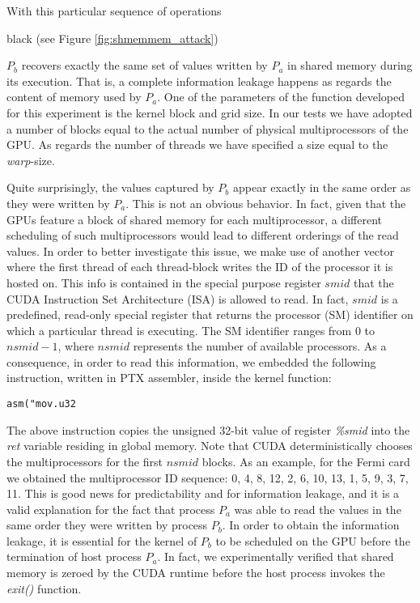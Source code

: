 \documentclass[11pt,onecolumn,letterpaper]{IEEEtran}
\newcommand{\clr}{black}
\begin{document}
With this particular sequence of operations 
\begin{color}{\clr}
(see Figure \ref{fig:shmemmem_attack})  
\end{color}
\label{leakagequantity} 
$P_b$ recovers exactly the same set of values written by $P_a$ in shared memory during its execution.
That is, a complete information leakage happens as regards the content of memory used by $P_a$.
One of the parameters of the function developed for this experiment is the kernel block and grid size.
In our tests we have adopted a number of blocks equal to the actual number of physical multiprocessors of the GPU.
As regards the number of threads we have specified a size equal to the \textit{warp}-size.

Quite surprisingly, the values captured by $P_b$ appear exactly in the same order as they were written by $P_a$.
This is not an obvious behavior. 
In fact, given that the GPUs feature a block of shared memory for each multiprocessor, 
a different scheduling of such multiprocessors would lead to different orderings of the read values.
In order to better investigate this issue, we make use of another vector 
where the first thread of each thread-block writes the ID of the processor it is hosted on. This info is contained in the special purpose register $smid$ that the CUDA Instruction Set Architecture (ISA) is allowed to read.
In fact, $smid$ is a predefined, read-only special register that returns the processor (SM) identifier on which a particular thread is executing.
The SM identifier ranges from $0$ to $nsmid-1$, where $nsmid$ represents the number of available processors.
As a consequence, in order to read this information, we embedded the following instruction, written in PTX assembler, inside the kernel function:
\begin{Verbatim}[frame=single]
asm("mov.u32 \end{Verbatim}
The above instruction copies the unsigned 32-bit value of register \emph{\%smid} into the \emph{ret} variable residing in global memory.
Note that CUDA deterministically chooses the multiprocessors for the first $nsmid$ blocks.
As an example, for the Fermi card we obtained the multiprocessor ID sequence: 0, 4, 8, 12, 2, 6, 10, 13, 1, 5, 9, 3, 7, 11.
This is good news for predictability and for information leakage, 
and it is a valid explanation for the fact that process $P_a$ was able to read the values in the same order they were written by process $P_b$.
In order to obtain the information leakage, it is essential for the kernel of $P_b$ to be scheduled on the GPU before the termination of host process $P_a$.
In fact, we experimentally verified that shared memory is zeroed by the CUDA runtime before the host process invokes the \emph{exit()} function.
\end{document}

